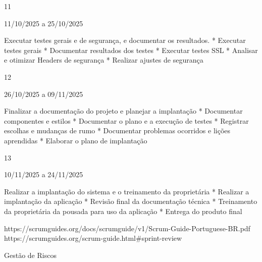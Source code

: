 11
	

11/10/2025 a 25/10/2025
	

Executar testes gerais e de segurança, e documentar os resultados.
	* Executar testes gerais
* Documentar resultados dos testes
* Executar testes SSL
* Analisar e otimizar Headers de segurança
* Realizar ajustes de segurança
	





12
	

26/10/2025 a 09/11/2025
	



Finalizar a documentação do projeto e planejar a implantação
	* Documentar componentes e estilos
* Documentar o plano e a execução de testes
* Registrar escolhas e mudanças de rumo
* Documentar problemas ocorridos e lições aprendidas
* Elaborar o plano de implantação
	





13
	

10/11/2025 a 24/11/2025
	

Realizar a implantação do sistema e o treinamento da proprietária
	* Realizar a implantação da aplicação
* Revisão final da documentação técnica
* Treinamento da proprietária da pousada para uso da aplicação
* Entrega do produto final 
	





https://scrumguides.org/docs/scrumguide/v1/Scrum-Guide-Portuguese-BR.pdf
https://scrumguides.org/scrum-guide.html#sprint-review














Gestão de Riscos

